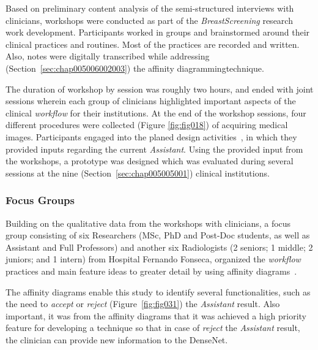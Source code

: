 Based on preliminary content analysis of the semi-structured interviews with clinicians, workshops were conducted as part of the {\it BreastScreening} research work development.
Participants worked in groups and brainstormed around their clinical practices and routines.
Most of the practices are recorded and written.
Also, notes were digitally transcribed while addressing (Section~\ref{sec:chap005006002003}) the affinity diagramming\footnotemark[30] technique.


The duration of workshop by session was roughly two hours, and ended with joint sessions wherein each group of clinicians highlighted important aspects of the clinical {\it workflow} for their institutions.
At the end of the workshop sessions, four different procedures were collected (Figure \ref{fig:fig018}) of acquiring medical images.
Participants engaged into the planed design activities~\cite{https://doi.org/10.13140/rg.2.2.16566.14403/1}, in which they provided inputs regarding the current {\it Assistant}.
Using the provided input from the workshops, a prototype was designed which was evaluated during several sessions at the nine (Section~\ref{sec:chap005005001}) clinical institutions.

\subsubsection{Focus Groups}
\label{sec:chap005006002002}

Building on the qualitative data from the workshops with clinicians, a focus group consisting of six Researchers (MSc, PhD and Post-Doc students, as well as Assistant and Full Professors) and another six Radiologists (2 seniors; 1 middle; 2 juniors; and 1 intern) from Hospital Fernando Fonseca, organized the {\it workflow} practices and main feature ideas to greater detail by using affinity diagrams~\cite{Harboe:2012:CSC:2145204.2145379, Hoiseth:2013:RGD:2468356.2468436}.

The affinity diagrams enable this study to identify several functionalities, such as the need to {\it accept} or {\it reject} (Figure~\ref{fig:fig031}) the {\it Assistant} result.
Also important, it was from the affinity diagrams that it was achieved a high priority feature for developing a technique so that in case of {\it reject} the {\it Assistant} result, the clinician can provide new information to the DenseNet.

